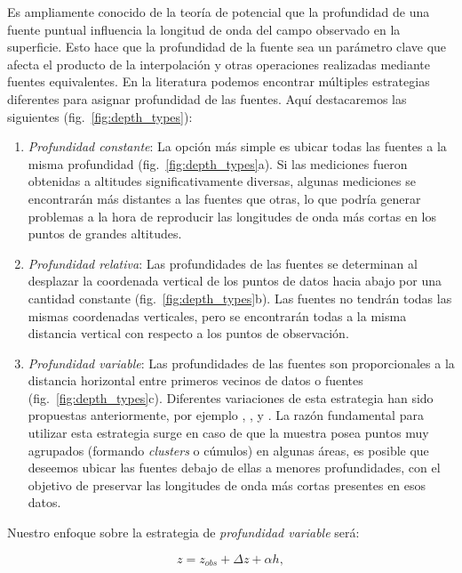 Es ampliamente conocido de la teoría de potencial que la profundidad de una
fuente puntual influencia la longitud de onda del campo observado en la
superficie.
Esto hace que la profundidad de la fuente sea un parámetro clave que afecta el
producto de la interpolación y otras operaciones realizadas mediante fuentes
equivalentes.
En la literatura podemos encontrar múltiples estrategias diferentes para
asignar profundidad de las fuentes.
Aquí destacaremos las siguientes (fig.~\ref{fig:depth_types}):

\begin{enumerate}
  \item
    \emph{Profundidad constante}:
    La opción más simple es ubicar todas las fuentes a la misma profundidad
    (fig.~\ref{fig:depth_types}a).
    Si las mediciones fueron obtenidas a altitudes significativamente diversas,
    algunas mediciones se encontrarán más distantes a las fuentes que otras,
    lo que podría generar problemas a la hora de reproducir las longitudes de
    onda más cortas en los puntos de grandes altitudes.
 \item
    \emph{Profundidad relativa}:
    Las profundidades de las fuentes se determinan al desplazar la coordenada
    vertical de los puntos de datos hacia abajo por una cantidad constante
    (fig.~\ref{fig:depth_types}b).
    Las fuentes no tendrán todas las mismas coordenadas verticales, pero se
    encontrarán todas a la misma distancia vertical con respecto a los puntos
    de observación.
 \item
    \emph{Profundidad variable}:
    Las profundidades de las fuentes son proporcionales a la distancia
    horizontal entre primeros vecinos de datos o fuentes (fig.~\ref{fig:depth_types}c).
    Diferentes variaciones de esta estrategia han sido propuestas
    anteriormente, por ejemplo
    \citet{cordell1992}, \citet{guspi2004}, y \citet{guspi2009}.
    La razón fundamental para utilizar esta estrategia surge en caso de que la
    muestra posea puntos muy agrupados (formando \emph{clusters} o cúmulos) en
    algunas áreas, es posible que deseemos ubicar las fuentes debajo de ellas
    a menores profundidades, con el objetivo de preservar las longitudes de
    onda más cortas presentes en esos datos.
\end{enumerate}

Nuestro enfoque sobre la estrategia de \emph{profundidad variable} será:

\begin{equation}
  z = z_{obs} + \Delta z + \alpha h,
  \label{eq:variable_depth}
\end{equation}

